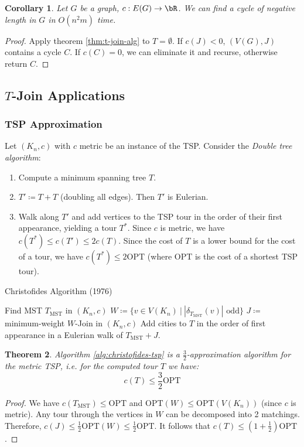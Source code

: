 \documentclass[11pt, a4paper]{article}
\newcommand{\abs}[1]{\left\lvert#1\right\rvert}
\newcommand{\set}[1]{\{#1\}}
\newtheorem{theorem}{Theorem}[section]
\newtheorem{cor}[theorem]{Corollary}
\theoremstyle{remark}
\theoremstyle{definition}
\begin{document}
\begin{cor}
	Let $G$ be a graph, $c: E(G)\to\bR$. We can find a cycle of negative length
	in $G$ in $O(n^2m)$ time.
\end{cor}
\begin{proof}
	Apply theorem \ref{thm:t-join-alg} to $T=\emptyset$. If $c(J)<0$,
	$(V(G),J)$ contains a cycle $C$. If $c(C)=0$, we can eliminate it and
	recurse, otherwise return $C$.
\end{proof}

\subsection{\texorpdfstring{$T$}{T}-Join Applications}
\subsubsection{TSP Approximation}
Let $(K_n,c)$ with $c$ metric be an instance of the TSP. Consider the
\emph{Double tree algorithm}:
\begin{enumerate}
	\item Compute a minimum spanning tree $T$.
	\item $T'\coloneqq T+T$ (doubling all edges). Then $T'$ is Eulerian.
	\item Walk along $T'$ and add vertices to the TSP tour in the order of
	their first appearance, yielding a tour $T^*$. Since $c$ is metric,
	we have $c(T^*)\leq c(T')\leq 2c(T)$. Since the cost of $T$ is a
	lower bound for the cost of a tour, we have $c(T^*)\leq
		2\mathrm{OPT}$ (where OPT is the cost of a shortest TSP tour).
\end{enumerate}

\begin{algorithm}[htbp]
	\caption{Christofides Algorithm (1976)}\label{alg:christofides-tsp}
	Find MST $T_{\mathrm{MST}}$ in $(K_n,c)$\;
	$W\coloneqq \set{v\in V(K_n)\ |\ \abs{\delta_{T_{\mathrm{MST}}}(v)}\text{ odd}}$\;
	$J\coloneqq$ minimum-weight $W$-Join  in $(K_n,c)$\;
	Add cities to $T$ in the order of first appearance in a Eulerian walk of
	$T_{\mathrm{MST}}+J$.\;
\end{algorithm}

\begin{theorem}
	Algorithm \ref{alg:christofides-tsp} is a $\frac{3}{2}$-approximation
	algorithm for the metric TSP, i.e. for the computed tour $T$ we have:
	\[c(T)\leq \frac{3}{2}\mathrm{OPT}\]
\end{theorem}
\begin{proof}
	We have $c(T_{\mathrm{MST}})\leq \mathrm{OPT}$ and $\mathrm{OPT}(W)\leq
		\mathrm{OPT}(V(K_n))$ (since $c$ is metric). Any tour through the vertices
	in $W$ can be decomposed into 2 matchings. Therefore,
	$c(J)\leq\frac{1}{2}\mathrm{OPT}(W)\leq\frac{1}{2}\mathrm{OPT}$. It
	follows that $c(T)\leq (1+\frac{1}{2})\mathrm{OPT}$.
\end{proof}
\end{document}
